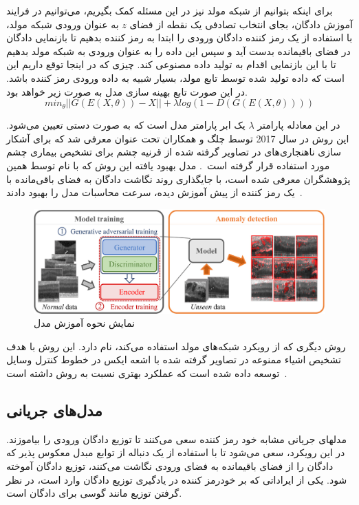 \documentclass[12pt,a4paper]{report}
\theoremstyle{definition}
\theoremstyle{definition}
\begin{document}
برای اینکه بتوانیم از شبکه مولد نیز در این مسئله کمک بگیریم، می‌توانیم در فرایند آموزش دادگان، بجای انتخاب تصادفی یک نقطه از فضای $z$ به عنوان ورودی شبکه مولد، با استفاده از یک رمز کننده دادگان ورودی را ابتدا به رمز کننده بدهیم تا بازنمایی دادگان در فضای باقیمانده بدست آید و سپس این داده را به عنوان ورودی به شبکه مولد بدهیم تا با این بازنمایی اقدام به تولید داده مصنوعی کند. چیزی که در اینجا توقع داریم این است که داده تولید شده توسط تابع مولد، بسیار شبیه به داده ورودی رمز کننده باشد. در این صورت تابع بهینه سازی مدل به صورت زیر خواهد بود.
\begin{equation}
	min_\theta ||G(E(X, \theta)) - X|| + \lambda log(1-D(G(E(X, \theta))))
\end{equation}

در این معادله پارامتر $\lambda$ یک ابر پارامتر مدل است که به صورت دستی تعیین می‌شود. این روش در سال 2017 توسط چلگ و همکاران تحت عنوان  معرفی شد که برای آشکار سازی ناهنجاری‌های در تصاویر  گرفته شده از قرنیه چشم برای تشخیص بیماری چشم مورد استفاده قرار گرفته است~\cite{10.1007/978-3-319-59050-9_12}. مدل بهبود یافته این روش که با نام  توسط همین پژوهشگران معرفی شده است، با جایگذاری روند نگاشت دادگان به فضای باقی‌مانده با یک رمز کننده از پیش آموزش دیده، سرعت محاسبات مدل را بهبود دادند~\cite{SCHLEGL201930}.
\begin{figure}[!h]
	\begin{center}
		\includegraphics[width=0.7\linewidth]{./images/figures/anogan.png}
	\end{center}
	\caption{نمایش نحوه آموزش مدل ~\cite{SCHLEGL201930}}
	\label{fig:vae}
	\centering
\end{figure}

روش دیگری که از رویکرد شبکه‌های مولد استفاده می‌کند،  نام دارد. این روش با هدف تشخیص اشیاء ممنوعه در تصاویر گرفته شده با اشعه ایکس در خطوط کنترل وسایل توسعه داده شده است که عملکرد بهتری نسبت به روش داشته است~\cite{akcay2018ganomaly}.
\subsection{مدل‌های جریانی}
مدلهای جریانی مشابه خود رمز کننده  سعی می‌کنند تا توزیع دادگان ورودی را بیاموزند. در این رویکرد، سعی می‌شود تا با استفاده از یک دنباله از توابع مبدل معکوس پذیر که دادگان را از فضای باقیمانده به فضای ورودی نگاشت می‌کنند، توزیع دادگان آموخته شود. یکی از ایراداتی که بر خودرمز کننده  در یادگیری توزیع دادگان وارد است، در نظر گرفتن توزیع مانند گوسی برای دادگان است.
\end{document}
